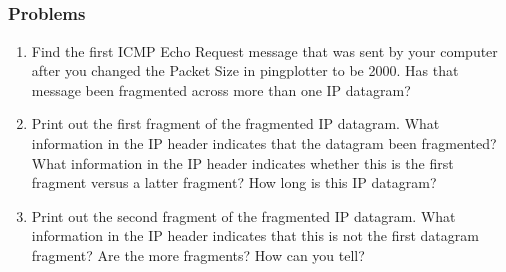 \subsection{ }
    \subsubsection*{Problems}
    \begin{enumerate}[label=\bfseries Problem \arabic*:,leftmargin=*,labelindent=1em]
    \addtocounter{enumi}{3}
        \item Find the first ICMP Echo Request message that was sent by your computer 
        after you changed the Packet Size in pingplotter to be 2000. 
        Has that message been fragmented across more than one IP datagram? \\[0.2mm]
        \soln
        \item Print out the first fragment of the fragmented IP datagram. 
        What information in the IP header indicates that the datagram been fragmented? 
        What information in the IP header indicates whether this is the first fragment versus a latter fragment? 
        How long is this IP datagram?\\[0.2mm]
        \soln
        \item Print out the second fragment of the fragmented IP datagram. 
        What information in the IP header indicates that this is not the first datagram fragment? 
        Are the more fragments? How can you tell?\\[0.2mm]

\end{enumerate}
